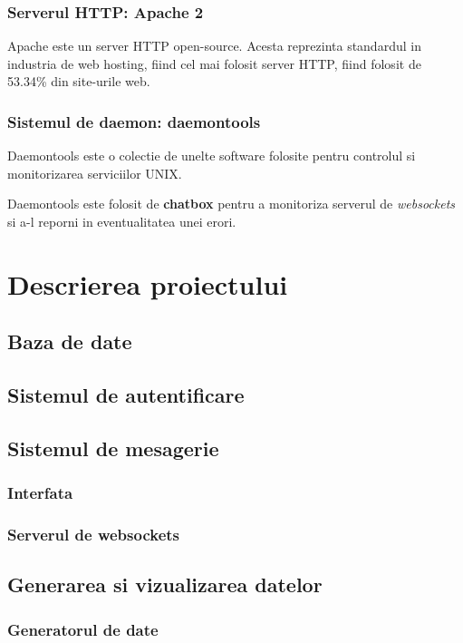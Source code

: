 \documentclass[14pt,a4paper]{extarticle}
\begin{document}
\subsubsection{Serverul HTTP: Apache 2}
Apache este un server HTTP open-source. Acesta reprezinta standardul in 
industria de web hosting, fiind cel mai folosit server HTTP, fiind folosit de 
53.34\% din site-urile web\cite{apache53}.
\subsubsection{Sistemul de daemon: daemontools}
Daemontools\cite{daemon} este o colectie de unelte software folosite pentru 
controlul si monitorizarea serviciilor UNIX. 

Daemontools este folosit de \textbf{chatbox} pentru a monitoriza serverul 
de \textit{websockets} si a-l reporni in eventualitatea unei erori.
\newpage
\section{Descrierea proiectului}

\subsection{Baza de date}

\subsection{Sistemul de autentificare}

\subsection{Sistemul de mesagerie}

\subsubsection{Interfata}

\subsubsection{Serverul de websockets}

\subsection{Generarea si vizualizarea datelor}

\subsubsection{Generatorul de date}
\end{document}
